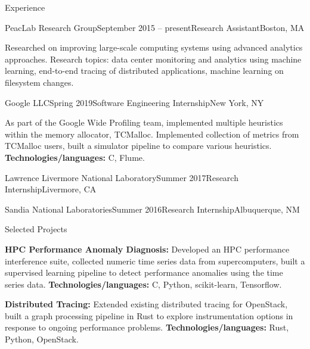 \documentclass{resume}
\begin{document}
\begin{rSection}{Experience}

\begin{rSubsection}{PeacLab Research Group}{September 2015 -- present}{Research
    Assistant}{Boston, MA}
\item Researched on improving large-scale computing systems using advanced
  analytics approaches. Research topics: data center monitoring and analytics
  using machine learning, end-to-end tracing of distributed applications,
  machine learning on filesystem changes.
\end{rSubsection}

\begin{rSubsection}{Google LLC}{Spring 2019}{Software Engineering
    Internship}{New York, NY}
\item As part of the Google Wide Profiling team, implemented multiple heuristics
  within the memory allocator, TCMalloc. Implemented collection of metrics from
  TCMalloc users, built a simulator pipeline to compare various heuristics.
  {\bf Technologies/languages:} C\plusplus, Flume.
\end{rSubsection}

\begin{rSubsection}{Lawrence Livermore National Laboratory}{Summer
    2017}{Research Internship}{Livermore, CA}
\end{rSubsection}

\begin{rSubsection}{Sandia National Laboratories}{Summer 2016}{Research
    Internship}{Albuquerque, NM}
\end{rSubsection}

\end{rSection}



\begin{rSection}{Selected Projects} %
\item {\bf HPC Performance Anomaly Diagnosis:} Developed an HPC performance
  interference suite, collected numeric time series data from supercomputers,
  built a supervised learning pipeline to detect performance anomalies using the
  time series data. {\bf Technologies/languages:} C, Python, scikit-learn,
  Tensorflow.
\item {\bf Distributed Tracing:} Extended existing distributed tracing for
  OpenStack, built a graph processing pipeline in Rust to explore
  instrumentation options in response to ongoing performance problems. {\bf
    Technologies/languages:} Rust, Python, OpenStack.
\end{rSection}
\end{document}

